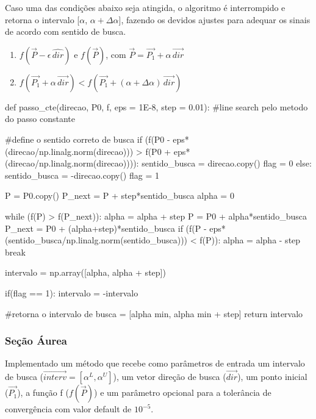 \documentclass[10pt, a4paper]{article}
\begin{document}
Caso uma das condições abaixo seja atingida, o algoritmo é interrompido e  retorna o intervalo [$\alpha$,  $\alpha + \Delta\alpha$], fazendo os devidos ajustes para adequar os sinais de acordo com sentido de busca.
\begin{enumerate}
  \item $f(\overrightarrow{P}-\epsilon\,\hat{dir})$ e $f(\overrightarrow{P})$, com $\overrightarrow{P} = \overrightarrow{P_1} + \alpha\,\overrightarrow{dir}$
  \item $f(\overrightarrow{P_1}+ \alpha\,\overrightarrow{dir}) < f(\overrightarrow{P_1}+ (\alpha + \Delta\alpha)\,\overrightarrow{dir})$  
\end{enumerate}


\begin{python}
  def passo_cte(direcao, P0, f, eps = 1E-8, step = 0.01):
    #line search pelo metodo do passo constante
      
    #define o sentido correto de busca
    if (f(P0 - eps*(direcao/np.linalg.norm(direcao))) > f(P0 + eps*(direcao/np.linalg.norm(direcao)))):
        sentido_busca = direcao.copy()
        flag = 0
    else:
        sentido_busca = -direcao.copy()
        flag = 1
        
    P = P0.copy()
    P_next = P + step*sentido_busca
    alpha = 0
   
    while (f(P) > f(P_next)):           
        alpha = alpha + step
        P = P0 + alpha*sentido_busca
        P_next = P0 + (alpha+step)*sentido_busca
        if (f(P - eps*(sentido_busca/np.linalg.norm(sentido_busca))) < f(P)):
            alpha = alpha - step
            break
    
    intervalo = np.array([alpha, alpha + step])
    
    if(flag == 1):
        intervalo = -intervalo
        
    #retorna o intervalo de busca = [alpha min, alpha min + step]                 
    return intervalo
\end{python}

\subsubsection{Seção Áurea}

Implementado um método que recebe como parâmetros de entrada um intervalo de busca
($\overrightarrow{interv} = [\alpha^L, \alpha^U]$), um vetor direção de busca ($\overrightarrow{dir}$), um ponto inicial ($\overrightarrow{P_1}$), a função f ($f(\overrightarrow{P})$) 
e um parâmetro opcional para a tolerância de convergência com valor default de $10^{-5}$.
\end{document}
